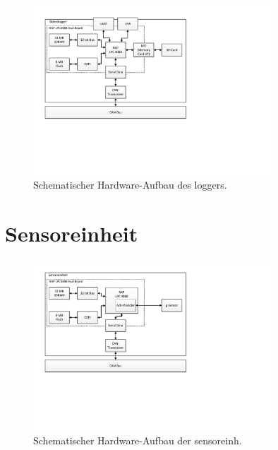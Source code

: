 \begin{figure}[H]
	\centering
		\includegraphics[width=0.8\textwidth]{images/visio/hardware_logger.pdf}
	\caption{Schematischer Hardware-Aufbau des \gls{logger}s.}
	\label{fig.hw_logger}
\end{figure}



\section{Sensoreinheit}

\begin{figure}[H]
	\centering
		\includegraphics[width=0.8\textwidth]{images/visio/hardware_sensor.pdf}
	\caption{Schematischer Hardware-Aufbau der \gls{sensoreinh}.}
	\label{fig.hw_sensor}
\end{figure}


